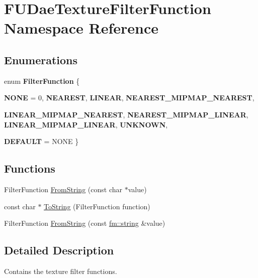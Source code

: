 \hypertarget{namespaceFUDaeTextureFilterFunction}{
\section{FUDaeTextureFilterFunction Namespace Reference}
\label{namespaceFUDaeTextureFilterFunction}
}
\subsection*{Enumerations}
\begin{DoxyCompactItemize}
\item 
enum {\bfseries FilterFunction} \{ \par
{\bfseries NONE} =  0, 
{\bfseries NEAREST}, 
{\bfseries LINEAR}, 
{\bfseries NEAREST\_\-MIPMAP\_\-NEAREST}, 
\par
{\bfseries LINEAR\_\-MIPMAP\_\-NEAREST}, 
{\bfseries NEAREST\_\-MIPMAP\_\-LINEAR}, 
{\bfseries LINEAR\_\-MIPMAP\_\-LINEAR}, 
{\bfseries UNKNOWN}, 
\par
{\bfseries DEFAULT} =  NONE
 \}
\end{DoxyCompactItemize}
\subsection*{Functions}
\begin{DoxyCompactItemize}
\item 
FilterFunction \hyperlink{namespaceFUDaeTextureFilterFunction_af46557827f9dbe21ac8b468cfa84e5d7}{FromString} (const char $\ast$value)
\item 
const char $\ast$ \hyperlink{namespaceFUDaeTextureFilterFunction_aff1f69db827a3b3dabb2aa04abbc2c0f}{ToString} (FilterFunction function)
\item 
FilterFunction \hyperlink{namespaceFUDaeTextureFilterFunction_ad8476b0bfb413c0a71404a9db2cb3f64}{FromString} (const \hyperlink{classfm_1_1stringT}{fm::string} \&value)
\end{DoxyCompactItemize}


\subsection{Detailed Description}
Contains the texture filter functions. 

